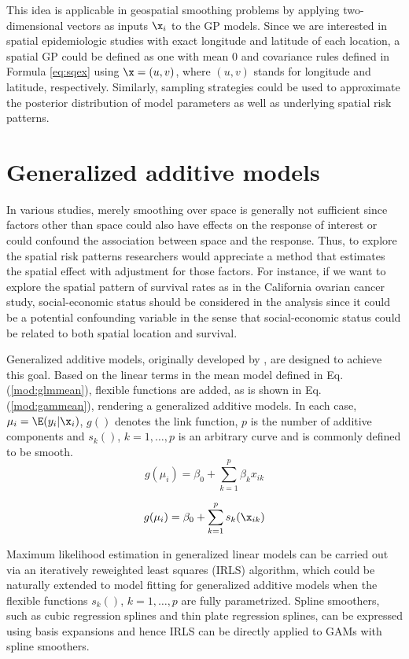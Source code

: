 This idea is applicable in geospatial smoothing problems by applying two-dimensional vectors as inputs $\x_i$ to the GP models. Since we are interested in spatial epidemiologic studies with exact longitude and latitude of each location, a spatial GP could be defined as one with mean $0$ and covariance rules defined in Formula \ref{eq:sqex} using $\x=(u,v)$, where $(u,v)$ stands for longitude and latitude, respectively. Similarly, sampling strategies could be used to approximate the posterior distribution of model parameters as well as underlying spatial risk patterns. 

\section{Generalized additive models}

In various studies, merely smoothing over space is generally not sufficient since factors other than space could also have effects on the response of interest or could confound the association between space and the response. Thus, to explore the spatial risk patterns researchers would appreciate a method that estimates the spatial effect with adjustment for those factors. For instance, if we want to explore the spatial pattern of survival rates as in the California ovarian cancer study, social-economic status should be considered in the analysis since it could be a potential confounding variable in the sense that social-economic status could be related to both spatial location and survival. 

Generalized additive models, originally developed by \cite{hastie1990generalized}, are designed to achieve this goal. Based on the linear terms in the mean model defined in Eq. (\ref{mod:glmmean}), flexible functions are added, as is shown in Eq. (\ref{mod:gammean}), rendering a generalized additive models. In each case, $\mu_i=\E(y_i|\x_i)$, $g()$ denotes the link function, $p$ is the number of additive components and $s_k()$, $k=1,\dots,p$ is an arbitrary curve and is commonly defined to be smooth. 
\begin{equation} \label{mod:glmmean}
g(\mu_i) =\beta_0+\sum_{k=1}^{p}\beta_kx_{ik}
\end{equation} 

\begin{equation} \label{mod:gammean}
g(\mu_i) =\beta_0+\sum_{k=1}^{p}s_k(\x_{ik})
\end{equation}

Maximum likelihood estimation in generalized linear models can be carried out via an iteratively reweighted least squares (IRLS) algorithm, which could be naturally extended to model fitting for generalized additive models when the flexible functions $s_k()$, $k=1,\dots,p$ are fully parametrized. Spline smoothers, such as cubic regression splines and thin plate regression splines, can be expressed using basis expansions and hence IRLS can be directly applied to GAMs with spline smoothers. 

